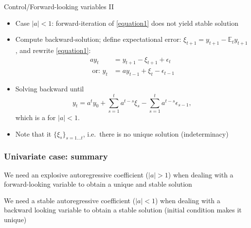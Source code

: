 \documentclass[handout,usepdftitle=false,xcolor=dvipsnames,aspectratio=169]{beamer}
\begin{document}
\begin{frame}{Control/Forward-looking variables II}
\begin{itemize}
\item Case $|a|<1$: forward-iteration of \eqref{equation1} does not yield stable solution
\item Compute backward-solution; define expectational error:
$ \xi_{t+1} = y_{t+1}-\mathbb{E}_t y_{t+1}$,
and rewrite \eqref{equation1}:
\begin{align}
  a y_t &=   y_{t+1}- \xi_{t+1} +  \epsilon_t \\
  \text{ or: }  y_{t} &= a y_{t-1} + \xi_{t}  -  \epsilon_{t-1}
\end{align}
\item Solving backward until
\begin{equation}\label{solution4}
    y_t = a^t y_0 + \sum_{s=1}^t a^{t-s}\xi_s - \sum_{s=1}^{t}
    a^{t-s} \epsilon_{s-1},
\end{equation}
which is a  for $|a|<1$.
\item Note that it  $\{\xi_{s}\}_{s=1\dots t}$, i.e.\ there is no unique solution (indeterminacy)
\end{itemize}
\end{frame}
\note{
\[\begin{gathered}
  a{y_t} = {y_{t + 1}} - {\xi_{t + 1}} + {\epsilon _t}{\text{ or: }} \hfill \\
  {y_t} = a{y_{t - 1}} + {\xi_t} - {\epsilon _{t - 1}} \hfill \\
  {y_t} = a\left( {a{y_{t - 2}} + {\xi_{t - 1}} - {\epsilon _{t - 2}}} \right) + {\xi_t} - {\epsilon _{t - 1}} \hfill \\
   = {a^2}{y_{t - 2}} + a{z_{t - 1}} + {\xi_t} - a{\epsilon _{t - 2}} - {\epsilon _{t - 1}} \hfill \\
   \hfill \\
  {y_t} = {a^t}{y_0} + \sum\limits_{s = 1}^t {{a^{t - s}}} {z_s} - \sum\limits_{s = 1}^t {{a^{t - s}}} {\epsilon _{s - 1}}, \hfill \\
\end{gathered} \]
}


\begin{frame}
\frametitle{Univariate case: summary}
\begin{witemize}
\item We need an explosive autoregressive coefficient ($|a|>1$) when dealing with a forward-looking
variable to obtain a unique and stable solution
\item We need a stable autoregressive coefficient ($|a|<1$) when dealing with a backward looking
variable to obtain a stable solution (initial condition makes it unique)
\end{witemize}
\end{frame}
\end{document}
